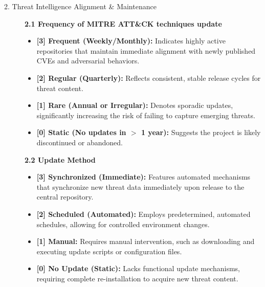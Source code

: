 \begin{description}
    \item[2. Threat Intelligence Alignment \& Maintenance] \hfill \par
    \textbf{2.1 Frequency of MITRE ATT\&CK techniques update}
    \begin{itemize}
        \item \textbf{[3] Frequent (Weekly/Monthly):} Indicates highly active repositories that maintain immediate alignment with newly published CVEs and adversarial behaviors.
        \item \textbf{[2] Regular (Quarterly):} Reflects consistent, stable release cycles for threat content.
        \item \textbf{[1] Rare (Annual or Irregular):} Denotes sporadic updates, significantly increasing the risk of failing to capture emerging threats.
        \item \textbf{[0] Static (No updates in $>$ 1 year):} Suggests the project is likely discontinued or abandoned.
    \end{itemize}
    \textbf{2.2 Update Method}
    \begin{itemize}
        \item \textbf{[3] Synchronized (Immediate):} Features automated mechanisms that synchronize new threat data immediately upon release to the central repository.
        \item \textbf{[2] Scheduled (Automated):} Employs predetermined, automated schedules, allowing for controlled environment changes.
        \item \textbf{[1] Manual:} Requires manual intervention, such as downloading and executing update scripts or configuration files.
        \item \textbf{[0] No Update (Static):} Lacks functional update mechanisms, requiring complete re-installation to acquire new threat content.
    \end{itemize}


\end{description}
